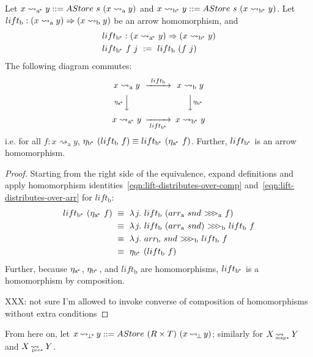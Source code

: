 \documentclass[preprint]{sigplanconf}
\newcommand{\arrow}{\rightsquigarrow}
\newcommand{\arrowlift}{\ensuremath{lift}}
\newcommand{\arrowarr}{\ensuremath{arr}}
\newcommand{\arrowcomp}{\ensuremath{{>}\mspace{-6mu}{>}\mspace{-6mu}{>}}}
\newcommand{\arrowtrans}{\ensuremath{\eta}}
\newcommand{\gen}{_\mathrm{a}}
\newcommand{\genb}{_\mathrm{b}}
\newcommand{\genc}{_\mathrm{a^{\mspace{-2mu}*}}}
\newcommand{\gend}{_\mathrm{b^{\mspace{-2mu}*}}}
\DeclareMathOperator{\botto}{\arrow_{\mspace{-3mu}\bot}}
\newcommand{\pbot}{{\bot^{\mspace{-4mu}*}}}
\DeclareMathOperator{\pbotto}{\arrow_{\mspace{-3mu}\pbot}}
\DeclareMathOperator{\pmapto}{\arrow_{\mspace{-22mu}_{\mathrm{map*}}}}
\DeclareMathOperator{\ppreto}{\arrow_{\mspace{-19mu}_{\mathrm{pre*}}}}
\begin{document}
\begin{theorem}
Let $x \arrow\genc y ::= AStore~s~(x \arrow\gen y)$ and $x \arrow\gend y ::= AStore~s~(x \arrow\gend y)$.
Let $\arrowlift\genb : (x \arrow\gen y) \tto (x \arrow\genb y)$ be an arrow homomorphism, and
\begin{equation}
\begin{aligned}
	&\arrowlift\gend : (x \arrow\genc y) \tto (x \arrow\gend y) \\
	&\arrowlift\gend~f~j \ := \ \arrowlift\genb~(f~j)
\end{aligned}
\end{equation}
The following diagram commutes:
\begin{equation}
\begin{CD}
	x \arrow\gen y @>{\arrowlift\genb}>> x \arrow\genb y \\
	@V{\arrowtrans\genc}VV   @VV{\arrowtrans\gend}V \\
	x \arrow\genc y @>>{\arrowlift\gend}> x \arrow\gend y
\end{CD}
\end{equation}
i.e. for all $f : x \arrow\gen y$, $\arrowtrans\gend~(\arrowlift\genb~f) \equiv \arrowlift\gend~(\arrowtrans\genc~f)$.
Further, $\arrowlift\gend$ is an arrow homomorphism.
\end{theorem}
\begin{proof}
Starting from the right side of the equivalence, expand definitions and apply homomorphism identities~\eqref{eqn:lift-distributes-over-comp} and~\eqref{eqn:lift-distributes-over-arr} for $\arrowlift\genb$:
\begin{align*}
	\arrowlift\gend~(\arrowtrans\genc~f)
	&\ \equiv\ \fun{j}{\arrowlift\genb~(\arrowarr\gen~snd~\arrowcomp\gen~f)}
\\
	&\ \equiv\ \fun{j}{\arrowlift\genb~(\arrowarr\gen~snd)~\arrowcomp\genb~\arrowlift\genb~f}
\\
	&\ \equiv\ \fun{j}{\arrowarr\genb~snd~\arrowcomp\genb~\arrowlift\genb~f}
\\
	&\ \equiv\ \arrowtrans\gend~(\arrowlift\genb~f)
\end{align*}
Further, because $\arrowtrans\genc$, $\arrowtrans\gend$, and $\arrowlift\genb$ are homomorphisms, $\arrowlift\gend$ is a homomorphism by composition.

XXX: not sure I'm allowed to invoke converse of composition of homomorphisms without extra conditions
\end{proof}

From here on, let $x \pbotto y ::= AStore~(R \times T)~(x \botto y)$; similarly for $X \pmapto Y$ and $X \ppreto Y$.
\end{document}
